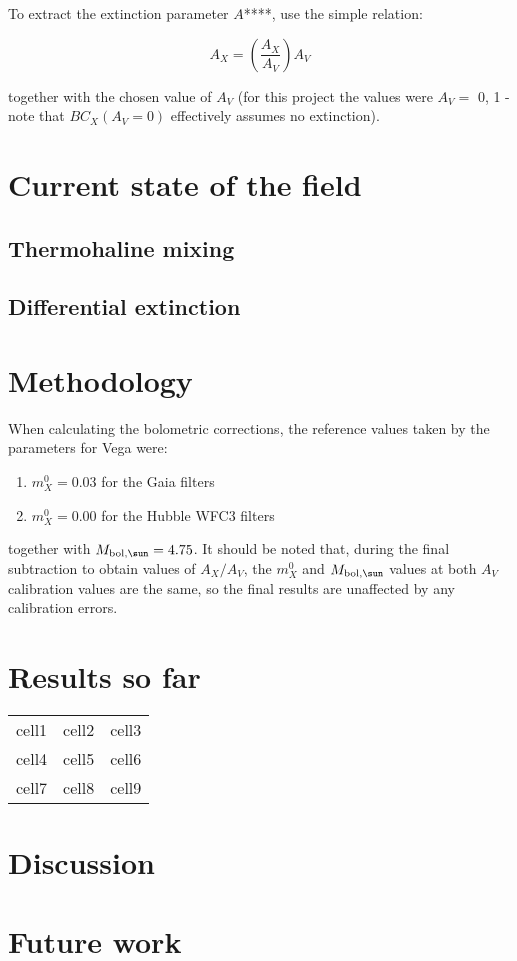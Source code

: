 \documentclass{mnras}
\begin{document}

To extract the extinction parameter $A$****, use the simple relation:

\begin{equation}
A_{X} = \left( \frac{A_{X}}{A_{V}} \right) A_{V}
\label{raio_eq}
\end{equation}

together with the chosen value of $A_{V}$ (for this project the values were $A_{V} =$ 0, 1 - note that $BC_{X}(A_{V}=0)$  effectively assumes no extinction).

\section{Current state of the field}
\subsection{Thermohaline mixing}

\subsection{Differential extinction}

\section{Methodology}
When calculating the bolometric corrections, the reference values taken by the parameters for Vega were:
\begin{enumerate}
\item $m_{X}^{0} = 0.03$ for the Gaia filters
\item $m_{X}^{0} = 0.00$ for the Hubble WFC3 filters
\end{enumerate}

together with $M_{\textnormal{bol},\sun} = 4.75$. It should be noted that, during the final subtraction to obtain values of $A_{X}/A_{V}$, the $m_{X}^{0}$ and $M_{\textnormal{bol},\sun}$ values at both $A_{V}$ calibration values are the same, so the final results are unaffected by any calibration errors.

\section{Results so far}

\begin{table}
\begin{tabular}{ccc}

cell1 & cell2 & cell3 \\ 
cell4 & cell5 & cell6 \\  
cell7 & cell8 & cell9 

\end{tabular}
\label{coeffs_table}
\end{table}




\section{Discussion}

\section{Future work}
\end{document}
